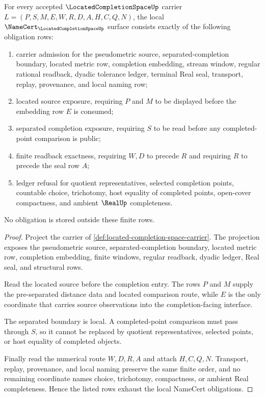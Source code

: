 \begin{theorem}
\label{thm:located-completion-space-namecert-obligations}
For every accepted $\LocatedCompletionSpaceUp$ carrier $L=(P,S,M,E,W,R,D,A,H,C,Q,N)$, the local $\NameCert_{\LocatedCompletionSpaceUp}$ surface consists exactly of the following obligation rows:
\begin{enumerate}
\item carrier admission for the pseudometric source, separated-completion boundary, located metric row, completion embedding, stream window, regular rational readback, dyadic tolerance ledger, terminal Real seal, transport, replay, provenance, and local naming row;
\item located source exposure, requiring $P$ and $M$ to be displayed before the embedding row $E$ is consumed;
\item separated completion exposure, requiring $S$ to be read before any completed-point comparison is public;
\item finite readback exactness, requiring $W,D$ to precede $R$ and requiring $R$ to precede the seal row $A$;
\item ledger refusal for quotient representatives, selected completion points, countable choice, trichotomy, host equality of completed points, open-cover compactness, and ambient $\RealUp$ completeness.
\end{enumerate}
No obligation is stored outside these finite rows.
\end{theorem}
\begin{proof}
Project the carrier of \autoref{def:located-completion-space-carrier}. The projection exposes the pseudometric source, separated-completion boundary, located metric row, completion embedding, finite windows, regular readback, dyadic ledger, Real seal, and structural rows.

Read the located source before the completion entry. The rows $P$ and $M$ supply the pre-separated distance data and located comparison route, while $E$ is the only coordinate that carries source observations into the completion-facing interface.

The separated boundary is local. A completed-point comparison must pass through $S$, so it cannot be replaced by quotient representatives, selected points, or host equality of completed objects.

Finally read the numerical route $W,D,R,A$ and attach $H,C,Q,N$. Transport, replay, provenance, and local naming preserve the same finite order, and no remaining coordinate names choice, trichotomy, compactness, or ambient Real completeness. Hence the listed rows exhaust the local NameCert obligations.
\end{proof}


